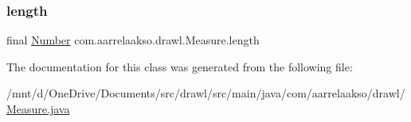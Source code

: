 \subsubsection{\texorpdfstring{length}{length}}
{\footnotesize\ttfamily final \hyperlink{interfacecom_1_1aarrelaakso_1_1drawl_1_1_number}{Number} com.\+aarrelaakso.\+drawl.\+Measure.\+length\hspace{0.3cm}{\ttfamily [private]}}



The documentation for this class was generated from the following file\+:\begin{DoxyCompactItemize}
\item 
/mnt/d/\+One\+Drive/\+Documents/src/drawl/src/main/java/com/aarrelaakso/drawl/\hyperlink{_measure_8java}{Measure.\+java}\end{DoxyCompactItemize}
